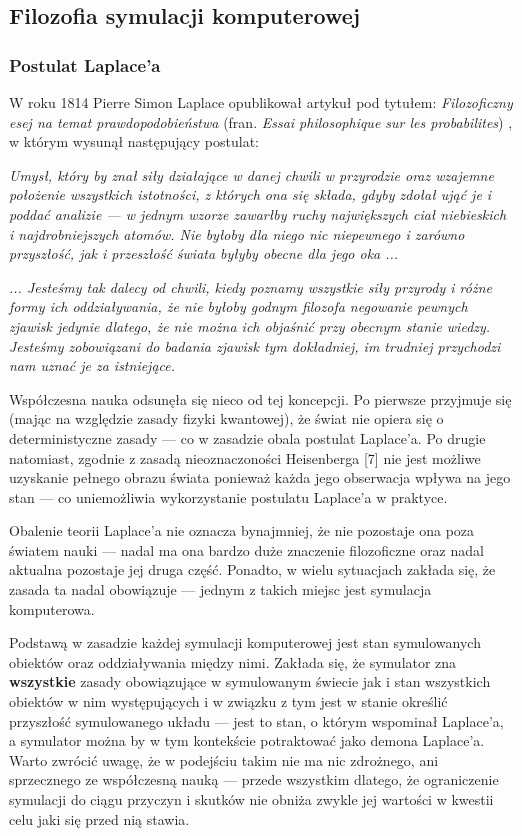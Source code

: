 \subsection{Filozofia symulacji komputerowej}

\subsubsection{Postulat Laplace'a}
\par{
W roku 1814 Pierre Simon Laplace opublikował artykuł pod tytułem: \textit{Filozoficzny esej na temat prawdopodobieństwa} (fran. \textit{Essai philosophique sur les probabilites}) \cite{Laplace}, w którym wysunął następujący postulat:
}
\par{
\textit{Umysł, który by znał siły działające w danej chwili w przyrodzie oraz wzajemne położenie wszystkich istotności, z których ona się składa, gdyby zdołał ująć je i poddać analizie --- w jednym wzorze zawarłby ruchy największych ciał niebieskich i najdrobniejszych atomów. Nie byłoby dla niego nic niepewnego i zarówno przyszłość, jak i przeszłość świata byłyby obecne dla jego oka ...
}}
\par{
\textit{... Jesteśmy tak dalecy od chwili, kiedy poznamy wszystkie siły przyrody i różne formy ich oddziaływania, że nie byłoby godnym filozofa negowanie pewnych zjawisk jedynie dlatego, że nie można ich objaśnić przy obecnym stanie wiedzy. Jesteśmy zobowiązani do badania zjawisk tym dokładniej, im trudniej przychodzi nam uznać je za istniejące.}
}

\par{
Współczesna nauka odsunęła się nieco od tej koncepcji. Po pierwsze przyjmuje się (mając na względzie zasady fizyki kwantowej), że świat nie opiera się o deterministyczne zasady --- co w zasadzie obala postulat Laplace'a. Po drugie natomiast, zgodnie z zasadą nieoznaczoności Heisenberga [7] nie jest możliwe uzyskanie pełnego obrazu świata ponieważ każda jego obserwacja wpływa na jego stan --- co uniemożliwia wykorzystanie postulatu Laplace'a w praktyce.
}
\par{
Obalenie teorii Laplace'a nie oznacza bynajmniej, że nie pozostaje ona poza światem nauki --- nadal ma ona bardzo duże znaczenie filozoficzne oraz nadal aktualna pozostaje jej druga część. Ponadto, w wielu sytuacjach zakłada się, że zasada ta nadal obowiązuje --- jednym z takich miejsc jest symulacja komputerowa.
}
\par{
Podstawą w zasadzie każdej symulacji komputerowej jest stan symulowanych obiektów oraz oddziaływania między nimi. Zakłada się, że symulator zna \textbf{wszystkie} zasady obowiązujące w symulowanym świecie jak i stan wszystkich obiektów w nim występujących i w związku z tym jest w stanie określić przyszłość symulowanego układu --- jest to stan, o którym wspominał Laplace'a, a symulator można by w tym kontekście potraktować jako demona Laplace'a. Warto zwrócić uwagę, że w podejściu takim nie ma nic zdrożnego, ani sprzecznego ze współczesną nauką --- przede wszystkim dlatego, że ograniczenie symulacji do ciągu przyczyn i skutków nie obniża zwykle jej wartości w kwestii celu jaki się przed nią stawia.
}

